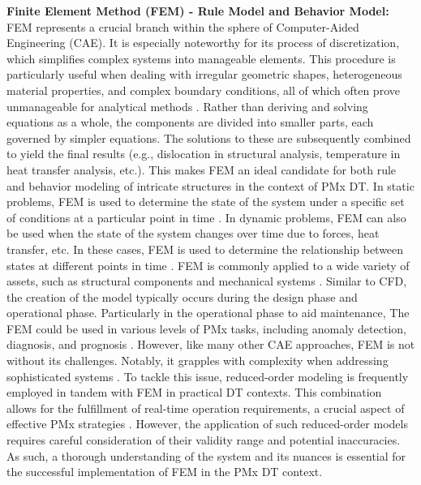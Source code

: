 \documentclass[runningheads]{llncs}
\begin{document}
\textbf{Finite Element Method (FEM) - Rule Model and Behavior Model:} FEM represents a crucial branch within the sphere of Computer-Aided Engineering (CAE). It is especially noteworthy for its process of discretization, which simplifies complex systems into manageable elements. This procedure is particularly useful when dealing with irregular geometric shapes, heterogeneous material properties, and complex boundary conditions, all of which often prove unmanageable for analytical methods \cite{zhang2019fast}. Rather than deriving and solving equations as a whole, the components are divided into smaller parts, each governed by simpler equations. The solutions to these are subsequently combined to yield the final results (e.g., dislocation in structural analysis, temperature in heat transfer analysis, etc.). This makes FEM an ideal candidate for both rule and behavior modeling of intricate structures in the context of PMx DT. In static problems, FEM is used to determine the state of the system under a specific set of conditions at a particular point in time \cite{kapteyn2022data}. In dynamic problems, FEM can also be used when the state of the system changes over time due to forces, heat transfer, etc. In these cases, FEM is used to determine the relationship between states at different points in time \cite{urbas2021machine}. FEM is commonly applied to a wide variety of assets, such as structural components \cite{kapteyn2020toward} and mechanical systems \cite{tuegel2011reengineering}. Similar to CFD, the creation of the model typically occurs during the design phase and operational phase. Particularly in the operational phase to aid maintenance, The FEM could be used in various levels of PMx tasks, including anomaly detection, diagnosis, and prognosis \cite{tuegel2011reengineering}. However, like many other CAE approaches, FEM is not without its challenges. Notably, it grapples with complexity when addressing sophisticated systems \cite{kapteyn2022data}. To tackle this issue, reduced-order modeling is frequently employed in tandem with FEM in practical DT contexts. This combination allows for the fulfillment of real-time operation requirements, a crucial aspect of effective PMx strategies \cite{hurkamp2020combining, kapteyn2022data}. However, the application of such reduced-order models requires careful consideration of their validity range and potential inaccuracies. As such, a thorough understanding of the system and its nuances is essential for the successful implementation of FEM in the PMx DT context.\\
\end{document}
